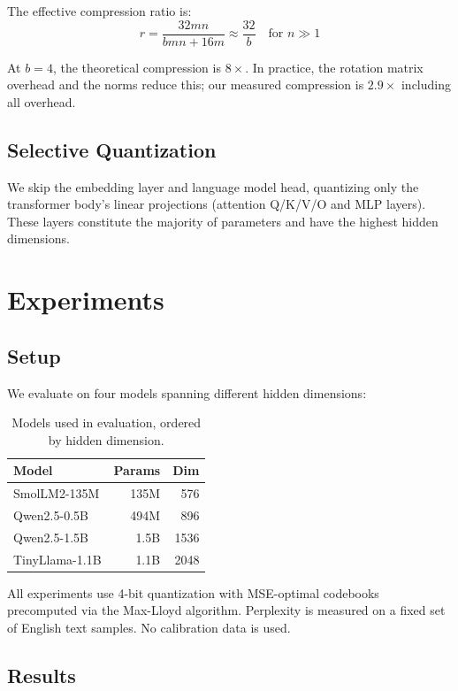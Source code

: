 \documentclass[11pt,twocolumn,letterpaper]{article}
\begin{document}
The effective compression ratio is:
\begin{equation}
r = \frac{32mn}{bmn + 16m} \approx \frac{32}{b} \quad \text{for } n \gg 1
\end{equation}

At $b = 4$, the theoretical compression is $8\times$. In practice, the rotation matrix overhead and the norms reduce this; our measured compression is $2.9\times$ including all overhead.

\subsection{Selective Quantization}

We skip the embedding layer and language model head, quantizing only the transformer body's linear projections (attention Q/K/V/O and MLP layers). These layers constitute the majority of parameters and have the highest hidden dimensions.

\section{Experiments}

\subsection{Setup}

We evaluate on four models spanning different hidden dimensions:

\begin{table}[h]
\centering
\small
\begin{tabular}{@{}lrr@{}}
\toprule
\textbf{Model} & \textbf{Params} & \textbf{Dim} \\
\midrule
SmolLM2-135M & 135M & 576 \\
Qwen2.5-0.5B & 494M & 896 \\
Qwen2.5-1.5B & 1.5B & 1536 \\
TinyLlama-1.1B & 1.1B & 2048 \\
\bottomrule
\end{tabular}
\caption{Models used in evaluation, ordered by hidden dimension.}
\label{tab:models}
\end{table}

All experiments use 4-bit quantization with MSE-optimal codebooks precomputed via the Max-Lloyd algorithm. Perplexity is measured on a fixed set of English text samples. No calibration data is used.

\subsection{Results}
\end{document}
